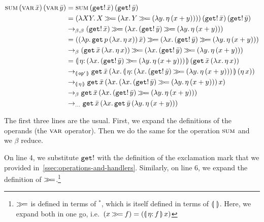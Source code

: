 \NoChapterPrefix
\begin{align}
  \sumecn{\varec{x}}{\varec{y}}
  & = \sumecn{(\ap{\op{get}!}{\bar{x}})}
    {(\ap{\op{get}!}{\bar{y}})} \\
  & = \app{(\lam{X Y}{X \hsbind (\lam{x}{Y \hsbind (\lam{y}{\ap{\eta}{(x + y)}})})})}
    {(\ap{\op{get}!}{\bar{x}})}
    {(\ap{\op{get}!}{\bar{y}})} \\
  & \to_{\beta,\beta} (\ap{\op{get}!}{\bar{x}}) \hsbind (\lam{x}{
    (\ap{\op{get}!}{\bar{y}}) \hsbind (\lam{y}{
    \ap{\eta}{(x + y)}})}) \\
  & = (\ap{(\lam{p}{\app{\op{get}}{p}{(\lam{x}{\etaE{x}})}})}{\bar{x}}) \hsbind (\lam{x}{
    (\ap{\op{get}!}{\bar{y}}) \hsbind (\lam{y}{
    \ap{\eta}{(x + y)}})}) \\
  & \to_{\beta} (\app{\op{get}}{\bar{x}}{(\lam{x}{\etaE{x}})}) \hsbind (\lam{x}{
    (\ap{\op{get}!}{\bar{y}}) \hsbind (\lam{y}{
    \ap{\eta}{(x + y)}})}) \\
  & = \ap{\banana{\onto{\eta}{(\lam{x}{(\ap{\op{get}!}{\bar{y}}) \hsbind (\lam{y}{
    \ap{\eta}{(x + y)}})})}}}{(\app{\op{get}}{\bar{x}}{(\lam{x}{\etaE{x}})})} \\
  & \to_{\banana{\op{op}'}} \app{\op{get}}{\bar{x}}
    {(\lam{x}{\ap{\banana{\onto{\eta}{(\lam{x}{(\ap{\op{get}!}{\bar{y}})
    \hsbind (\lam{y}{\ap{\eta}{(x + y)}})})}}}{(\ap{\eta}{x})}})} \\
  & \to_{\banana{\eta}} \app{\op{get}}{\bar{x}}
    {(\lam{x}{\ap{(\lam{x}{(\ap{\op{get}!}{\bar{y}})
    \hsbind (\lam{y}{\ap{\eta}{(x + y)}})})}{x}})} \\
  & \to_{\beta} \app{\op{get}}{\bar{x}}
    {(\lam{x}{(\ap{\op{get}!}{\bar{y}})
    \hsbind (\lam{y}{\ap{\eta}{(x + y)}})})} \\
  & \to_{\ldots} \app{\op{get}}{\bar{x}}
    {(\lam{x}{\app{\op{get}}{\bar{y}}{(\lam{y}{\ap{\eta}{(x + y)}})}})}
\end{align}
\setcounter{equation}{0}
\ChapterPrefix

The first three lines are the usual. First, we expand the definitions of
the operands (the $\textsc{var}$ operator). Then we do the same for the operation
$\textsc{sum}$ and we $\beta$ reduce.

On line 4, we substitute $\mathtt{get}!$ with the definition of the exclamation
mark that we provided in~\ref{ssec:operations-and-handlers}. Similarly, on
line 6, we expand the definition of $\mathbin{\gg\!=}$.\footnote{$\mathbin{\gg\!=}$ is defined
  in terms of $^*$, which is itself defined in terms of $\llparenthesis \,  \, \rrparenthesis$. Here,
  we expand both in one go, i.e.\ $(x \hsbind f) =
  (\ap{\banana{\onto{\eta}{f}}}{x})$}

